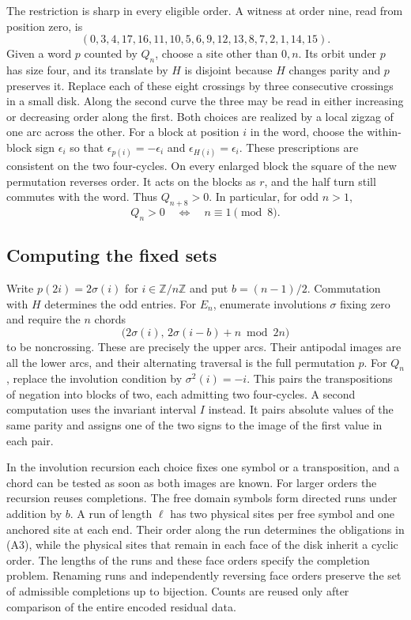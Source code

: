 The restriction is sharp in every eligible order. A witness at order
nine, read from position zero, is
\[
(0,3,4,17,16,11,10,5,6,9,12,13,8,7,2,1,14,15).
\]
Given a word \(p\) counted by \(Q_n\), choose a
site other than \(0,n\). Its orbit under \(p\) has size four, and
its translate by \(H\) is disjoint because \(H\) changes parity
and \(p\) preserves it. Replace each of these eight crossings by
three consecutive crossings in a small disk. Along the second
curve the three may be read in either increasing or decreasing
order along the first. Both choices are realized by a local
zigzag of one arc across the other. For a block at position \(i\)
in the word, choose the within-block sign \(\epsilon_i\) so that
\(\epsilon_{p(i)}=-\epsilon_i\) and
\(\epsilon_{H(i)}=\epsilon_i\). These prescriptions are consistent
on the two four-cycles. On every enlarged block the square of the
new permutation reverses order. It acts on the blocks as \(r\),
and the half turn still commutes with the word. Thus \(Q_{n+8}>0\).
In particular, for odd \(n>1\),
\[
 Q_n>0\quad\Longleftrightarrow\quad n\equiv1\pmod8.
\]

\subsection*{Computing the fixed sets}
Write \(p(2i)=2\sigma(i)\) for \(i\in\mathbb Z/n\mathbb Z\) and
put \(b=(n-1)/2\). Commutation with \(H\) determines the odd entries.
For \(E_n\), enumerate involutions \(\sigma\) fixing zero and
require the \(n\) chords
\[
  \bigl(2\sigma(i),\,2\sigma(i-b)+n\bmod 2n\bigr)               \tag{A3}
\]
to be noncrossing. These are precisely the upper arcs. Their
antipodal images are all the lower arcs, and their alternating
traversal is the full permutation \(p\). For \(Q_n\), replace the
involution condition by \(\sigma^2(i)=-i\). This pairs the
transpositions of negation into blocks of two, each admitting two
four-cycles. A second computation uses the invariant interval \(I\)
instead. It pairs absolute values of the same parity and assigns
one of the two signs to the image of the first value in each pair.

In the involution recursion each choice fixes one symbol or a
transposition, and a chord can be tested as soon as both images
are known. For larger orders the recursion reuses completions.
The free domain symbols form directed runs under addition by \(b\).
A run of length \(\ell\) has two physical sites per free symbol
and one anchored site at each end. Their order along the run
determines the obligations in (A3), while the physical sites that
remain in each face of the disk inherit a cyclic order. The lengths
of the runs and these face orders specify the completion problem.
Renaming runs and independently reversing face orders preserve the
set of admissible completions up to bijection. Counts are reused
only after comparison of the entire encoded residual data.

